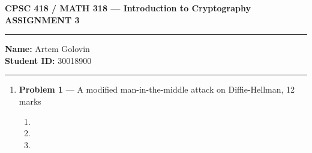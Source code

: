 \documentclass[11pt]{article}
\theoremstyle{definition}
\begin{document}
\begin{center}

  \bf \Large CPSC 418 / MATH 318 --- Introduction to Cryptography \\
  ASSIGNMENT 3

\end{center}


\medskip \hrule
  \textbf{Name:} Artem Golovin \\
  \textbf{Student ID:} 30018900
\medskip \hrule


\begin{enumerate} \itemsep 0.3in

\item[] \textbf{Problem 1} --- A modified man-in-the-middle attack on Diffie-Hellman, 12 marks

\begin{enumerate}
    \item %

    \item %

    \item %

\end{enumerate}

\newpage
\end{enumerate}
\end{document}
